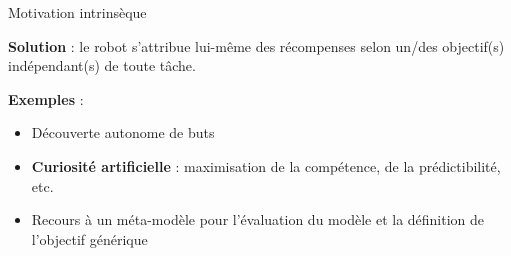 \documentclass[xcolor=pst,dvips,12pt,english,french]{beamer}
\begin{document}
	\begin{frame}{Motivation intrinsèque}
		\begin{block}{}
			\textbf{Solution} : le robot s'attribue lui-même des récompenses selon un/des objectif(s) indépendant(s) de toute tâche. 
		\end{block}
		\begin{exampleblock}{}
			\textbf{Exemples} : 
			\begin{itemize}
				\item Découverte autonome de buts
				\item \textbf{Curiosité artificielle} : maximisation de la compétence, de la prédictibilité, etc.
				\item Recours à un méta-modèle pour l'évaluation du modèle et la définition de l'objectif générique
			\end{itemize}
		\end{exampleblock} 
		\vfill
		\tiny
		\\
	\end{frame}
	
\end{document}
